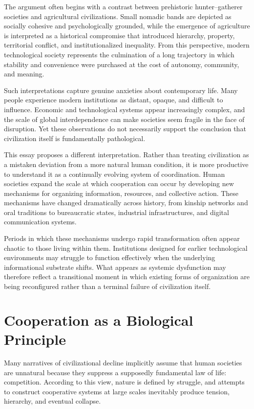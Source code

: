 \documentclass[12pt]{article}
\begin{document}
The argument often begins with a contrast between prehistoric hunter--gatherer societies and agricultural civilizations. Small nomadic bands are depicted as socially cohesive and psychologically grounded, while the emergence of agriculture is interpreted as a historical compromise that introduced hierarchy, property, territorial conflict, and institutionalized inequality. From this perspective, modern technological society represents the culmination of a long trajectory in which stability and convenience were purchased at the cost of autonomy, community, and meaning.

Such interpretations capture genuine anxieties about contemporary life. Many people experience modern institutions as distant, opaque, and difficult to influence. Economic and technological systems appear increasingly complex, and the scale of global interdependence can make societies seem fragile in the face of disruption. Yet these observations do not necessarily support the conclusion that civilization itself is fundamentally pathological.

This essay proposes a different interpretation. Rather than treating civilization as a mistaken deviation from a more natural human condition, it is more productive to understand it as a continually evolving system of coordination. Human societies expand the scale at which cooperation can occur by developing new mechanisms for organizing information, resources, and collective action. These mechanisms have changed dramatically across history, from kinship networks and oral traditions to bureaucratic states, industrial infrastructures, and digital communication systems.

Periods in which these mechanisms undergo rapid transformation often appear chaotic to those living within them. Institutions designed for earlier technological environments may struggle to function effectively when the underlying informational substrate shifts. What appears as systemic dysfunction may therefore reflect a transitional moment in which existing forms of organization are being reconfigured rather than a terminal failure of civilization itself.

\section{Cooperation as a Biological Principle}

Many narratives of civilizational decline implicitly assume that human societies are unnatural because they suppress a supposedly fundamental law of life: competition. According to this view, nature is defined by struggle, and attempts to construct cooperative systems at large scales inevitably produce tension, hierarchy, and eventual collapse.
\end{document}
